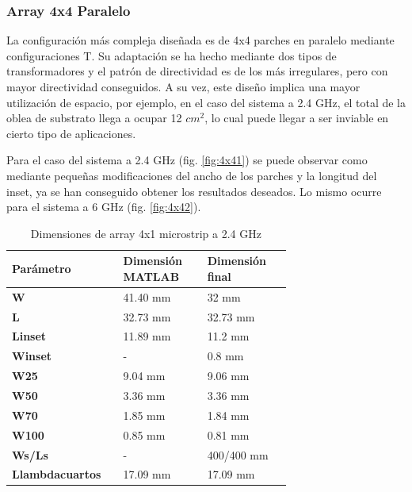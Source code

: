 \subsubsection{Array 4x4 Paralelo} 
\par La configuración más compleja diseñada es de 4x4 parches en paralelo mediante configuraciones T. Su adaptación se ha hecho mediante dos tipos de transformadores y el patrón de directividad es de los más irregulares, pero con mayor directividad conseguidos. A su vez, este diseño implica una mayor utilización de espacio, por ejemplo, en el caso del sistema a 2.4 GHz, el total de la oblea de substrato llega a ocupar 12 $cm^{2}$, lo cual puede llegar a ser inviable en cierto tipo de aplicaciones. 
\\
\par Para el caso del sistema a 2.4 GHz (fig. \ref{fig:4x41}) se puede observar como mediante pequeñas modificaciones del ancho de los parches y la longitud del inset, ya se han conseguido obtener los resultados deseados. Lo mismo ocurre para el sistema a 6 GHz (fig. \ref{fig:4x42}).
\\
\begin{table}[H]
  

   \small %
   \centering %
   \begin{tabular}{m{0.2\linewidth}m{0.25\linewidth}m{0.25\linewidth}} %
   \toprule[\heavyrulewidth]\toprule[\heavyrulewidth]
   \textbf{Parámetro} & \textbf{Dimensión MATLAB} & \textbf{Dimensión final} \\ 
   \midrule
   \textbf{W} & 41.40 mm & 32 mm \\
   \textbf{L} & 32.73 mm & 32.73 mm\\
   \textbf{Linset} & 11.89 mm & 11.2 mm\\
   \textbf{Winset} & - & 0.8 mm\\
   \textbf{W25} & 9.04 mm & 9.06 mm\\
   \textbf{W50} & 3.36 mm & 3.36 mm\\
   \textbf{W70} & 1.85 mm & 1.84 mm\\
   \textbf{W100} & 0.85 mm & 0.81 mm\\
   \textbf{Ws/Ls} & - & 400/400 mm\\
   \textbf{Llambdacuartos} & 17.09 mm & 17.09 mm\\
   \bottomrule[\heavyrulewidth] 
   \end{tabular}
   \caption{Dimensiones de array 4x1 microstrip a 2.4 GHz} 
      \label{tab:array4x41}
\end{table}


